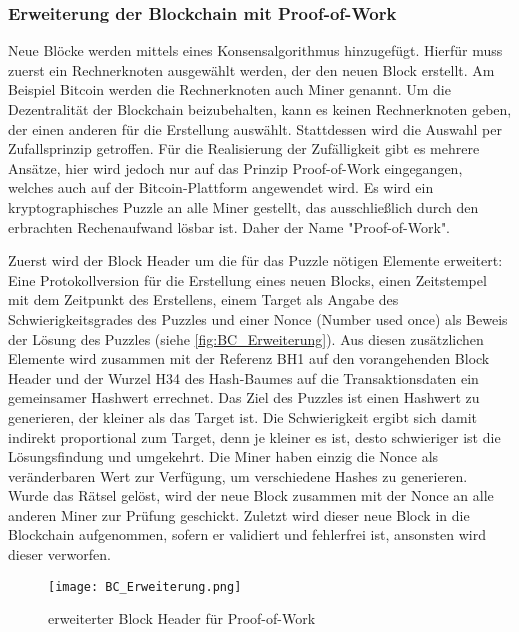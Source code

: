 \subsubsection{Erweiterung der Blockchain mit Proof-of-Work}
\label{sec:Erweiterung}
Neue Blöcke werden mittels eines Konsensalgorithmus hinzugefügt.
Hierfür muss zuerst ein Rechnerknoten ausgewählt werden, der den neuen Block erstellt. 
Am Beispiel Bitcoin werden die Rechnerknoten auch \glqq Miner\grqq{} genannt.
Um die Dezentralität der Blockchain beizubehalten, kann es keinen Rechnerknoten geben, der einen 
anderen für die Erstellung auswählt. Stattdessen wird die Auswahl per Zufallsprinzip getroffen.
Für die Realisierung der Zufälligkeit gibt es mehrere Ansätze, hier wird jedoch nur auf das
Prinzip \glqq Proof-of-Work\grqq{} eingegangen, welches auch auf der Bitcoin-Plattform angewendet wird.
Es wird ein kryptographisches Puzzle an alle Miner gestellt, das ausschließlich
durch den erbrachten Rechenaufwand lösbar ist. Daher der Name "Proof-of-Work". 

Zuerst wird der Block Header um die für das Puzzle nötigen Elemente 
erweitert: Eine Protokollversion für die Erstellung eines neuen Blocks, einen Zeitstempel mit
dem Zeitpunkt des Erstellens, einem Target als Angabe des Schwierigkeitsgrades des Puzzles
und einer Nonce (Number used once) als Beweis der Lösung des Puzzles (siehe \autoref{fig:BC_Erweiterung}).
Aus diesen zusätzlichen Elemente wird zusammen mit der Referenz BH1 auf den vorangehenden 
Block Header und der Wurzel H34 des Hash-Baumes auf die Transaktionsdaten ein gemeinsamer 
Hashwert errechnet. 
Das Ziel des Puzzles ist einen Hashwert zu generieren, der kleiner als das Target ist. Die 
Schwierigkeit ergibt sich damit indirekt proportional zum Target, denn je kleiner es ist, desto
schwieriger ist die Lösungsfindung und umgekehrt.
Die Miner haben einzig die Nonce als veränderbaren Wert zur Verfügung, um verschiedene Hashes zu generieren. 
Wurde das Rätsel gelöst, wird der neue Block zusammen mit der Nonce an alle anderen Miner zur Prüfung
geschickt.
Zuletzt wird dieser neue Block in die Blockchain aufgenommen, sofern er validiert und 
fehlerfrei ist, ansonsten wird dieser verworfen.
\cite[p.~22ff]{fill2020blockchain}


    
\begin{figure}[h]
    \begin{center}
        \texttt{[image: BC\_Erweiterung.png]}
    \end{center}
    \caption{erweiterter Block Header für Proof-of-Work}
    \label{fig:BC_Erweiterung}
\end{figure}



